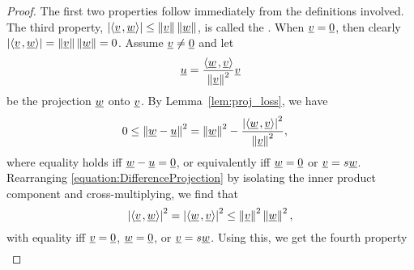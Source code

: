\begin{proof}
The first two properties follow immediately from the definitions involved.
The third property, $\left| {\left\langle  \underline{v}  \mskip2mu ,  \underline{w}  \right\rangle} \right| \leq \left\| \underline{v} \right\| \left\| \underline{w} \right\|$, is called the .
When $\underline{v} = \underline{0}$, then clearly $\left| {\left\langle  \underline{v}  \mskip2mu ,  \underline{w}  \right\rangle} \right| = \left\| \underline{v} \right\| \left\| \underline{w} \right\| =0$.
Assume $\underline{v} \neq \underline{0}$ and let
\begin{equation*}
\underline{u} = \frac{ {\left\langle  \underline{w}  \mskip2mu ,  \underline{v}  \right\rangle}}{ \left\| \underline{v} \right\|^2 } \underline{v}
\end{equation*}
be the projection $\underline{w}$ onto $\underline{v}$.
By Lemma~\ref{lem:proj_loss},
we have
\begin{align} \label{equation:DifferenceProjection}
0 &\leq \left\| \underline{w} - \underline{u} \right\|^2
= \left\| \underline{w} \right\|^2
- \frac{ \left| {\left\langle  \underline{w}  \mskip2mu ,  \underline{v}  \right\rangle} \right|^2 }
{ \left\| \underline{v} \right\|^2 } ,
\end{align}
where equality holds iff $\underline{w}-\underline{u}=\underline{0}$, or equivalently iff $\underline{w}=\underline{0}$ or $\underline{v} = s \underline{w}$.
Rearranging \eqref{equation:DifferenceProjection} by isolating the inner product component and cross-multiplying, we find that
\begin{equation*}
\left| {\left\langle  \underline{v}  \mskip2mu ,  \underline{w}  \right\rangle} \right|^2 = \left| {\left\langle  \underline{w}  \mskip2mu ,  \underline{v}  \right\rangle} \right|^2 \leq \left\| \underline{v} \right\|^2 \left\| \underline{w} \right\|^2,
\end{equation*}
with equality iff $\underline{v}=\underline{0}$, $\underline{w}=\underline{0}$, or $\underline{v} = s \underline{w}$.
Using this, we get the fourth property
\begin{equation*}
\begin{split}

\end{split}
\end{equation*}
\end{proof}
